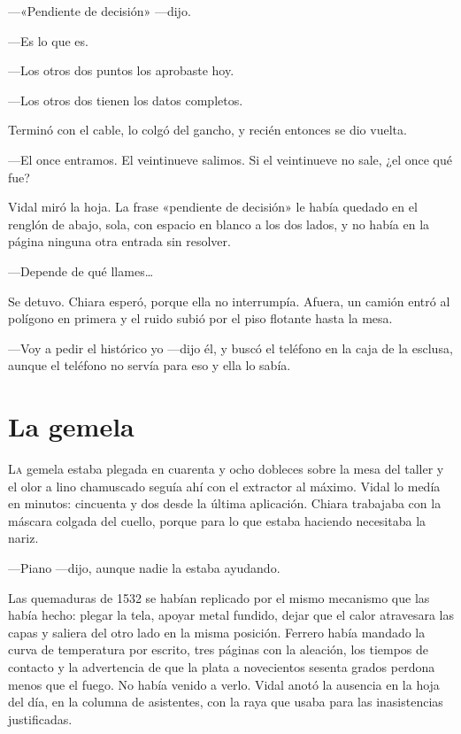 ---«Pendiente de decisión» ---dijo.

---Es lo que es.

---Los otros dos puntos los aprobaste hoy.

---Los otros dos tienen los datos completos.

Terminó con el cable, lo colgó del gancho, y recién entonces se dio vuelta.

---El once entramos. El veintinueve salimos. Si el veintinueve no sale, ¿el once qué fue?

Vidal miró la hoja. La frase «pendiente de decisión» le había quedado en el renglón de abajo, sola, con espacio en blanco a los dos lados, y no había en la página ninguna otra entrada sin resolver.

---Depende de qué llames\ldots{}

Se detuvo. Chiara esperó, porque ella no interrumpía. Afuera, un camión entró al polígono en primera y el ruido subió por el piso flotante hasta la mesa.

---Voy a pedir el histórico yo ---dijo él, y buscó el teléfono en la caja de la esclusa, aunque el teléfono no servía para eso y ella lo sabía.

\clearpage

\chapter{La gemela}

\lettrine[lines=2, lhang=0.1, nindent=0.2em]{L}{a} gemela estaba plegada en cuarenta y ocho dobleces sobre la mesa del taller y el olor a lino chamuscado seguía ahí con el extractor al máximo. Vidal lo medía en minutos: cincuenta y dos desde la última aplicación. Chiara trabajaba con la máscara colgada del cuello, porque para lo que estaba haciendo necesitaba la nariz.


---Piano ---dijo, aunque nadie la estaba ayudando.

Las quemaduras de 1532 se habían replicado por el mismo mecanismo que las había hecho: plegar la tela, apoyar metal fundido, dejar que el calor atravesara las capas y saliera del otro lado en la misma posición. Ferrero había mandado la curva de temperatura por escrito, tres páginas con la aleación, los tiempos de contacto y la advertencia de que la plata a novecientos sesenta grados perdona menos que el fuego. No había venido a verlo. Vidal anotó la ausencia en la hoja del día, en la columna de asistentes, con la raya que usaba para las inasistencias justificadas.

